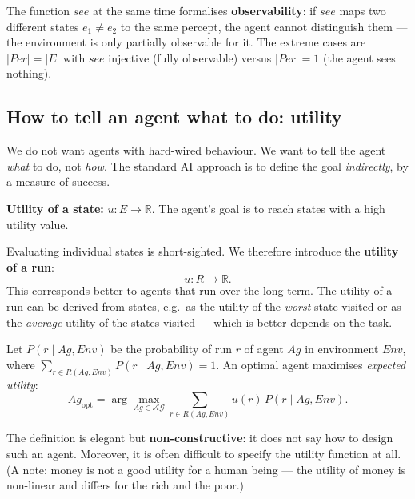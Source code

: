 \documentclass[11pt,a4paper]{article}
\theoremstyle{definition}
\begin{document}
The function $\mathit{see}$ at the same time formalises \textbf{observability}: if $\mathit{see}$
maps two different states $e_1 \ne e_2$ to the same percept, the agent cannot distinguish them ---
the environment is only partially observable for it. The extreme cases are
$|\mathit{Per}| = |E|$ with $\mathit{see}$ injective (fully observable) versus
$|\mathit{Per}| = 1$ (the agent sees nothing).

\subsection{How to tell an agent what to do: utility}

We do not want agents with hard-wired behaviour. We want to tell the agent \emph{what} to do, not
\emph{how}. The standard AI approach is to define the goal \emph{indirectly}, by a measure of
success.

\begin{defbox}[Utility]
\textbf{Utility of a state:} $u : E \to \mathbb{R}$. The agent's goal is to reach states with a
high utility value.

Evaluating individual states is short-sighted. We therefore introduce the \textbf{utility of a
run}:
\[
u : R \to \mathbb{R} .
\]
This corresponds better to agents that run over the long term. The utility of a run can be derived
from states, e.g.\ as the utility of the \emph{worst} state visited or as the \emph{average}
utility of the states visited --- which is better depends on the task.
\end{defbox}

\begin{defbox}
Let $P(r \mid Ag, \mathit{Env})$ be the probability of run $r$ of agent $Ag$ in environment
$\mathit{Env}$, where $\sum_{r \in R(Ag,\mathit{Env})} P(r \mid Ag,\mathit{Env}) = 1$. An optimal
agent maximises \emph{expected utility}:
\[
Ag_{\mathrm{opt}} = \arg\max_{Ag \in \mathcal{AG}} \sum_{r \in R(Ag,\mathit{Env})}
u(r)\, P(r \mid Ag, \mathit{Env}).
\]
\end{defbox}

The definition is elegant but \textbf{non-constructive}: it does not say how to design such an
agent. Moreover, it is often difficult to specify the utility function at all. (A note: money is
not a good utility for a human being --- the utility of money is non-linear and differs for the
rich and the poor.)
\end{document}
